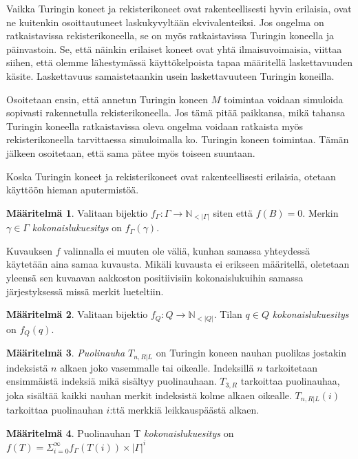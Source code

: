 \documentclass[a4paper, 12pt]{article}
\theoremstyle{definition}
\newtheorem{mydef}{Määritelmä}
\theoremstyle{plain}
\begin{document}
Vaikka Turingin koneet ja rekisterikoneet ovat rakenteellisesti hyvin erilaisia, ovat ne kuitenkin osoittautuneet laskukyvyltään ekvivalenteiksi. Jos ongelma on ratkaistavissa rekisterikoneella, se on myös ratkaistavissa Turingin koneella ja päinvastoin. Se, että näinkin erilaiset koneet ovat yhtä ilmaisuvoimaisia, viittaa siihen, että olemme lähestymässä käyttökelpoista tapaa määritellä laskettavuuden käsite. Laskettavuus samaistetaankin usein laskettavuuteen Turingin koneilla.

Osoitetaan ensin, että annetun Turingin koneen $M$ toimintaa voidaan simuloida sopivasti rakennetulla rekisterikoneella. Jos tämä pitää paikkansa, mikä tahansa Turingin koneella ratkaistavissa oleva ongelma voidaan ratkaista myös rekisterikoneella tarvittaessa simuloimalla ko. Turingin koneen toimintaa. Tämän jälkeen osoitetaan, että sama pätee myös toiseen suuntaan.

Koska Turingin koneet ja rekisterikoneet ovat rakenteellisesti erilaisia, otetaan käyttöön hieman aputermistöä.

\begin{mydef}
Valitaan bijektio $f_\Gamma : \Gamma \rightarrow \mathbb{N}_{<|\Gamma|}$ siten että $f(B) = 0$. Merkin $\gamma \in \Gamma$ \emph{kokonaislukuesitys} on $f_\Gamma(\gamma)$.
\end{mydef}
Kuvauksen $f$ valinnalla ei muuten ole väliä, kunhan samassa yhteydessä käytetään aina samaa kuvausta. Mikäli kuvausta ei erikseen määritellä, oletetaan yleensä sen kuvaavan aakkoston positiivisiin kokonaislukuihin samassa järjestyksessä missä merkit lueteltiin.

\begin{mydef}
Valitaan bijektio $f_Q : Q \rightarrow \mathbb{N}_{<|Q|}$. Tilan $q \in Q$ \emph{kokonaislukuesitys} on $f_Q(q)$.
\end{mydef}

\begin{mydef}
\emph{Puolinauha} $T_{n, R | L}$ on Turingin koneen nauhan puolikas jostakin indeksistä $n$ alkaen joko vasemmalle tai oikealle. Indeksillä $n$ tarkoitetaan ensimmäistä indeksiä mikä sisältyy puolinauhaan. $T_{3, R}$ tarkoittaa puolinauhaa, joka sisältää kaikki nauhan merkit indeksistä kolme alkaen oikealle. $T_{n, R | L}(i)$ tarkoittaa puolinauhan $i$:ttä merkkiä leikkauspäästä alkaen.
\end{mydef}

\begin{mydef}
Puolinauhan T \emph{kokonaislukuesitys} on $f(T) = \Sigma_{i=0}^{\infty} f_\Gamma(T(i)) \times |\Gamma|^i$
\end{mydef}
\end{document}
